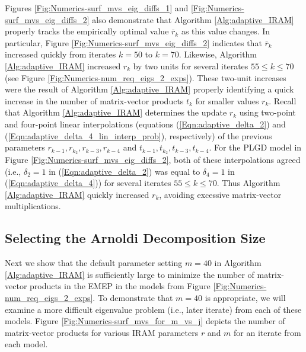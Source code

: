 Figures \ref{Fig:Numerics-surf_mvs_eig_diffs_1} and \ref{Fig:Numerics-surf_mvs_eig_diffs_2} also demonstrate that Algorithm \ref{Alg:adaptive_IRAM} properly tracks the empirically optimal value $\bar{r}_k$ as this value changes.
In particular, Figure \ref{Fig:Numerics-surf_mvs_eig_diffs_2} indicates that $\bar{r}_k$ increased quickly from iterates $k = 50$ to $k = 70$.
Likewise, Algorithm \ref{Alg:adaptive_IRAM} increased $r_k$ by two units for several iterates $55 \leq k \leq 70$ (see Figure \ref{Fig:Numerics-num_req_eigs_2_exps}).
These two-unit increases were the result of Algorithm \ref{Alg:adaptive_IRAM} properly identifying a quick increase in the number of matrix-vector products $t_k$ for smaller values $r_k$.
Recall that Algorithm \ref{Alg:adaptive_IRAM} determines the update $r_k$ using two-point and four-point linear interpolations (equations (\ref{Eqn:adaptive_delta_2}) and (\ref{Eqn:adaptive_delta_4_lin_interp_prob}), respectively) of the previous parameters $r_{k-1}, r_{k_2}, r_{k-3}, r_{k-4}$ and $t_{k-1}, t_{k_2}, t_{k-3}, t_{k-4}$.
For the PLGD model in Figure \ref{Fig:Numerics-surf_mvs_eig_diffs_2}, both of these interpolations agreed (i.e., $\delta_2=1$ in (\ref{Eqn:adaptive_delta_2}) was equal to $\delta_4=1$ in (\ref{Eqn:adaptive_delta_4})) for several iterates $55 \leq k \leq 70$.
Thus Algorithm \ref{Alg:adaptive_IRAM} quickly increased $r_k$, avoiding excessive matrix-vector multiplications.







\subsection{Selecting the Arnoldi Decomposition Size}		\label{Subsubsec:evol_mats-default_Arnoldi_decomp_size}



Next we show that the default parameter setting $m = 40$ in Algorithm \ref{Alg:adaptive_IRAM} is sufficiently large to minimize the number of matrix-vector products in the EMEP in the models from Figure \ref{Fig:Numerics-num_req_eigs_2_exps}.
To demonstrate that $m=40$ is appropriate, we will examine a more difficult eigenvalue problem (i.e., later iterate) from each of these models.
Figure \ref{Fig:Numerics-surf_mvs_for_m_vs_j} depicts the number of matrix-vector products for various IRAM parameters $r$ and $m$ for an iterate from each model.


